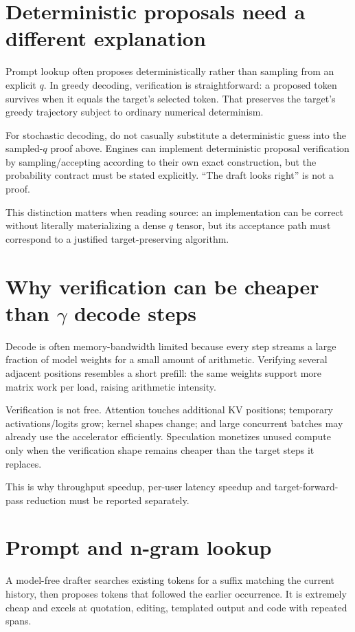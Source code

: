\section{Deterministic proposals need a different explanation}

Prompt lookup often proposes deterministically rather than sampling from an explicit
$q$. In greedy decoding, verification is straightforward: a proposed token survives
when it equals the target's selected token. That preserves the target's greedy
trajectory subject to ordinary numerical determinism.

For stochastic decoding, do not casually substitute a deterministic guess into the
sampled-$q$ proof above. Engines can implement deterministic proposal verification by
sampling/accepting according to their own exact construction, but the probability
contract must be stated explicitly. ``The draft looks right'' is not a proof.

This distinction matters when reading source: an implementation can be correct without
literally materializing a dense $q$ tensor, but its acceptance path must correspond to
a justified target-preserving algorithm.

\section{Why verification can be cheaper than $\gamma$ decode steps}

Decode is often memory-bandwidth limited because every step streams a large fraction
of model weights for a small amount of arithmetic. Verifying several adjacent
positions resembles a short prefill: the same weights support more matrix work per
load, raising arithmetic intensity.

Verification is not free. Attention touches additional KV positions; temporary
activations/logits grow; kernel shapes change; and large concurrent batches may
already use the accelerator efficiently. Speculation monetizes unused compute only
when the verification shape remains cheaper than the target steps it replaces.

This is why throughput speedup, per-user latency speedup and target-forward-pass
reduction must be reported separately.

\section{Prompt and n-gram lookup}

A model-free drafter searches existing tokens for a suffix matching the current
history, then proposes tokens that followed the earlier occurrence. It is extremely
cheap and excels at quotation, editing, templated output and code with repeated spans.

